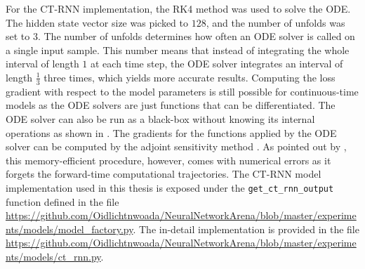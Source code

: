 \documentclass[draft,final]{vutinfth} %
\begin{document}
For the CT-RNN implementation, the RK4 method was used to solve the ODE. The hidden state vector size was picked to $128$, and the number of unfolds was set to $3$.
The number of unfolds determines how often an ODE solver is called on a single input sample. This number means that instead of integrating the whole interval of length $1$ at each time step, the ODE solver integrates an interval of length $\frac{1}{3}$ three times, which yields more accurate results.
Computing the loss gradient with respect to the model parameters is still possible for continuous-time models as the ODE solvers are just functions that can be differentiated.
The ODE solver can also be run as a black-box without knowing its internal operations as shown in \cite{NeuralODEs}.
The gradients for the functions applied by the ODE solver can be computed by the adjoint sensitivity method \cite{AdjointSensitivityMethod}.
As pointed out by \cite[p. 3]{LTCNetworks}, this memory-efficient procedure, however, comes with numerical errors as it forgets the forward-time computational trajectories.
The CT-RNN model implementation used in this thesis is exposed under the \texttt{get\_ct\_rnn\_output} function defined in the file \url{https://github.com/Oidlichtnwoada/NeuralNetworkArena/blob/master/experiments/models/model_factory.py}.
The in-detail implementation is provided in the file \url{https://github.com/Oidlichtnwoada/NeuralNetworkArena/blob/master/experiments/models/ct_rnn.py}.
\end{document}
